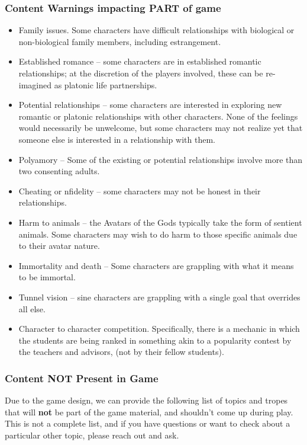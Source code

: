 \documentclass[sheet]{GL2020}
\begin{document}
\subsubsection{Content Warnings impacting PART of game}
\begin{itemize}
  	\item Family issues. Some characters have difficult relationships with biological or non-biological family members, including estrangement.
	\item Established romance -- some characters are in established romantic relationships; at the discretion of the players involved, these can be re-imagined as platonic life partnerships.
	\item Potential relationships -- some characters are interested in exploring new romantic or platonic relationships with other characters. None of the feelings would necessarily be unwelcome, but some characters may not realize yet that someone else is interested in a relationship with them.
	\item Polyamory -- Some of the existing or potential relationships involve more than two consenting adults.
	\item Cheating or nfidelity -- some characters may not be honest in their relationships.
	\item Harm to animals -- the Avatars of the Gods typically take the form of sentient animals. Some characters may wish to do harm to those specific animals due to their avatar nature.
	\item Immortality and death -- Some characters are grappling with what it means to be immortal.
	\item Tunnel vision -- sine characters are grappling with a single goal that overrides all else.
	\item Character to character competition. Specifically, there is a mechanic in which the students are being ranked in something akin to a popularity contest by the teachers and advisors, (not by their fellow students).

\end{itemize}

\subsubsection{Content NOT Present in Game}
Due to the game design, we can provide the following list of topics and tropes that will \textbf{not} be part of the game material, and shouldn't come up during play. This is not a complete list, and if you have questions or want to check about a particular other topic, please reach out and ask.
\end{document}
